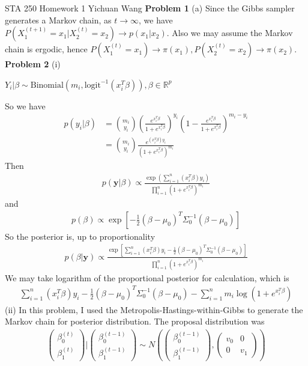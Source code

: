 \documentclass[12pt]{article}
\begin{document}
\noindent STA 250 Homework 1 \newline Yichuan Wang \newline \newline
\textbf{Problem 1} \newline
(a) Since the Gibbs sampler generates a Markov chain, as $t \rightarrow \infty$, we have $P(X_1^{(t+1)} = x_1 | X_2^{(t)} = x_2) \rightarrow p(x_1|x_2)$. Also we may assume the Markov chain is ergodic, hence $P(X_1^{(t)} = x_1) \rightarrow \pi(x_1), P(X_2^{(t)} = x_2) \rightarrow \pi(x_2)$.
\newline
\newline
\textbf{Problem 2} \newline
(i)
\begin{center}
	$Y_i|\beta \sim \text{Binomial}(m_i, \text{logit}^{-1}(x_i^T\beta)), \beta \in \mathbb{R}^p$
\end{center}
So we have
\begin{align*}
	p(y_i|\beta) &= {m_i \choose y_i}(\frac{e^{x_i^T\beta}}{1+e^{x_i^T\beta}})^{y_i}(1 - \frac{e^{x_i^T\beta}}{1+e^{x_i^T\beta}})^{m_i - y_i} \\
	&= {m_i \choose y_i}\frac{e^{(x_i^T\beta)y_i}}{(1+e^{x_i^T\beta})^{m_i}}
\end{align*}
Then
\begin{align*}
	p(\mathbf{y}|\beta) \propto \frac{\exp({\sum_{i=1}^n(x_i^T\beta)y_i})}{\prod_{i=1}^n (1+e^{x_i^T\beta})^{m_i}}
\end{align*}
and
\begin{align*}
	p(\beta) \propto \exp[-\frac{1}{2}(\beta - \mu_0)^T \Sigma_0^{-1} (\beta - \mu_0)]
\end{align*}
So the posterior is, up to proportionality
\begin{align*}
	p(\beta|\mathbf{y}) \propto \frac{\exp[\sum_{i=1}^n(x_i^T\beta)y_i - \frac{1}{2}(\beta - \mu_0)^T \Sigma_0^{-1} (\beta - \mu_0)]}{\prod_{i=1}^n (1+e^{x_i^T\beta})^{m_i}}
\end{align*}
We may take logarithm of the proportional posterior for calculation, which is
\begin{align*}
	\sum_{i=1}^n(x_i^T\beta)y_i - \frac{1}{2}(\beta - \mu_0)^T \Sigma_0^{-1} (\beta - \mu_0) - \sum_{i=1}^n m_i \log(1+e^{x_i^T\beta})
\end{align*}
(ii) In this problem, I used the Metropolis-Hastings-within-Gibbs to generate the Markov chain for posterior distribution. The proposal distribution was
\begin{align*}
	\begin{pmatrix} \beta_0^{(t)} \\ \beta_1^{(t)} \end{pmatrix} | \begin{pmatrix} \beta_0^{(t-1)} \\ \beta_1^{(t-1)} \end{pmatrix} \sim 					N(\begin{pmatrix} \beta_0^{(t-1)} \\ \beta_1^{(t-1)} \end{pmatrix}, \begin{pmatrix} v_0 & 0 \\ 0 & v_1 \end{pmatrix}) \\
\end{align*}
\end{document}
